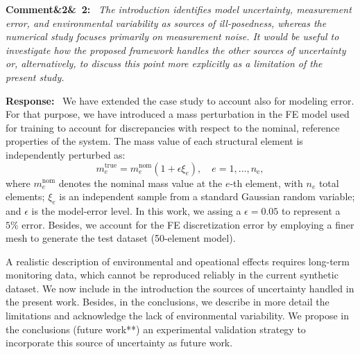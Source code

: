 \documentclass[11pt]{article}
\newenvironment{rcomment}[1]{\par\bigskip\noindent\textbf{Comment\ifx&#1&\else\ #1\fi:}\ \itshape}{\par}
\newenvironment{response}{\par\smallskip\noindent\color{resp}\textbf{Response:}\ }{\par}
\begin{document}
\begin{rcomment}{2}
The introduction identifies model uncertainty, measurement error, and environmental variability as sources of
ill-posedness, whereas the numerical study focuses primarily on measurement noise. It would be useful to investigate how
the proposed framework handles the other sources of uncertainty or, alternatively, to discuss this point more explicitly
as a limitation of the present study.
\end{rcomment}

\begin{response}
We have extended the case study to account also for modeling error.
For that purpose, we have introduced a mass perturbation in the FE model used for training to account for discrepancies with respect to the nominal, reference properties of the system. 
The mass value of each structural element is independently perturbed as: 
\begin{equation}
	m_e^{\text{true}} = m_e^{\text{nom}} \left(1 + \epsilon \xi_e\right), \quad e = 1, \dots, n_{\text{e}},
	\label{eq:modeling_error}
\end{equation}
where $m_e^{\text{nom}}$ denotes the nominal mass value at the $e$-th element, with $n_{e}$ total elements; $\xi_e$ is an independent sample from a standard Gaussian random variable; and $\epsilon$ is the model-error level. 
In this work, we assing a $\epsilon = 0.05$ to represent a $5\%$ error. 
Besides, we account for the FE discretization error by employing a finer mesh to generate the test dataset (50-element model). 

A realistic description of environmental and opeational effects requires long-term monitoring data, which cannot be reproduced reliably in the current synthetic dataset. 
We now include in the introduction the sources of uncertainty handled in the present work. 
Besides, in the conclusions, we describe in more detail the limitations and acknowledge the lack of environmental variability. 
We propose in the conclusions (future work**) an experimental validation strategy to incorporate this source of uncertainty as future work.



\end{response}
\end{document}
